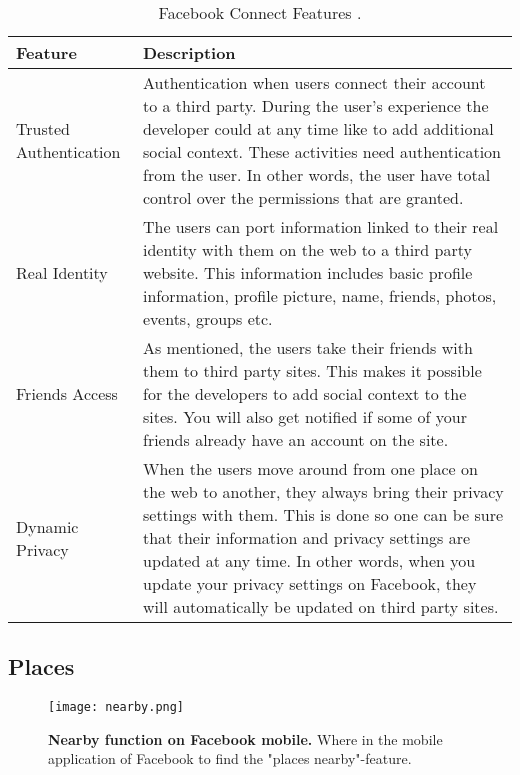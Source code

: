 \begin{center}
\begin{table}[!ht]
\caption{\label{tab:connect}Facebook Connect Features \cite{connect, connect2}.}
    \begin{tabular}{ | l | p{9cm} |}
    \hline
    \textbf{Feature} & \textbf{Description} \\ 
    \hline
    Trusted Authentication & Authentication when users connect their account to a third party. During the user's experience the developer could at any time like to add additional social context. These activities need authentication from the user. In other words, the user have total control over the permissions that are granted. \\ 
    \hline
    Real Identity &  The users can port information linked to their real identity with them on the web to a third party website. This information includes basic profile information, profile picture, name, friends, photos, events, groups etc. \\ 
    \hline
    Friends Access & As mentioned, the users take their friends with them to third party sites. This makes it possible for the developers to add social context to the sites. You will also get notified if some of your friends already have an account on the site.\\
    \hline
    Dynamic Privacy & When the users move around from one place on the web to another, they always bring their privacy settings with them. This is done so one can be sure that their information and privacy settings are updated at any time. In other words, when you update your privacy settings on Facebook, they will automatically be updated on third party sites.\\
	\hline
    \end{tabular}
   \end{table}
\end{center}


\subsection{Places}
\begin{figure}[t]
\centering
\texttt{[image: nearby.png]}
\caption[Nearby function on Facebook mobile]{\textbf{Nearby function on Facebook mobile.}  Where in the mobile application of Facebook to find the "places nearby"-feature.  } 
\label{fig:nearby}
\end{figure}

